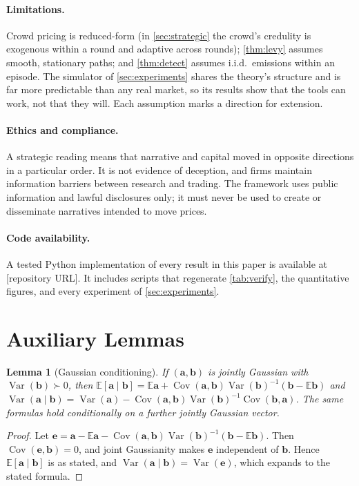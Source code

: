 \documentclass[11pt,a4paper]{article}
\theoremstyle{plain}
\newtheorem{lemma}[theorem]{Lemma}
\theoremstyle{definition}
\theoremstyle{remark}
\newcommand{\E}{\mathbb{E}}
\DeclareMathOperator{\Var}{Var}
\DeclareMathOperator{\Cov}{Cov}
\begin{document}
\paragraph{Limitations.} Crowd pricing is reduced-form (in \cref{sec:strategic} the crowd's credulity is exogenous within a round and adaptive across rounds); \cref{thm:levy} assumes smooth, stationary paths; and \cref{thm:detect} assumes i.i.d.\ emissions within an episode. The simulator of \cref{sec:experiments} shares the theory's structure and is far more predictable than any real market, so its results show that the tools can work, not that they will. Each assumption marks a direction for extension.

\paragraph{Ethics and compliance.} A strategic reading means that narrative and capital moved in opposite directions in a particular order. It is not evidence of deception, and firms maintain information barriers between research and trading. The framework uses public information and lawful disclosures only; it must never be used to create or disseminate narratives intended to move prices.

\paragraph{Code availability.} A tested Python implementation of every result in this paper is available at [repository URL]. It includes scripts that regenerate \cref{tab:verify}, the quantitative figures, and every experiment of \cref{sec:experiments}.

\appendix
\section{Auxiliary Lemmas}\label{app:aux}

\begin{lemma}[Gaussian conditioning]\label{lem:gauss}
If $(\bm a,\bm b)$ is jointly Gaussian with $\Var(\bm b)\succ0$, then $\E[\bm a\mid\bm b]=\E\bm a+\Cov(\bm a,\bm b)\Var(\bm b)^{-1}(\bm b-\E\bm b)$ and $\Var(\bm a\mid\bm b)=\Var(\bm a)-\Cov(\bm a,\bm b)\Var(\bm b)^{-1}\Cov(\bm b,\bm a)$. The same formulas hold conditionally on a further jointly Gaussian vector.
\end{lemma}
\begin{proof}
Let $\bm e=\bm a-\E\bm a-\Cov(\bm a,\bm b)\Var(\bm b)^{-1}(\bm b-\E\bm b)$. Then $\Cov(\bm e,\bm b)=0$, and joint Gaussianity makes $\bm e$ independent of $\bm b$. Hence $\E[\bm a\mid\bm b]$ is as stated, and $\Var(\bm a\mid\bm b)=\Var(\bm e)$, which expands to the stated formula.
\end{proof}
\end{document}
